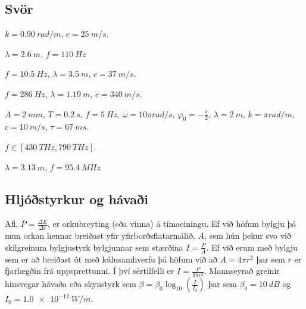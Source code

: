 \ifdefined \wholebook \else\documentclass[oneside]{book}\usepackage{EdlBook}\graphicspath{{figures/}}
\begin{document}
\subsection*{Svör}

\begin{enumerate*}[label = \vspace{0.15cm} \textbf{(\arabic*)}]
    \setcounter{enumi}{7}
  \item $k = \SI{0.90}{rad/m}$, $c = \SI{25}{m/s}$.
  \item $\lambda = \SI{2.6}{m}$, $f = \SI{110}{Hz}$
  \item $f = \SI{10.5}{Hz}$, $\lambda = \SI{3.5}{m}$, $c = \SI{37}{m/s}$.
  \item $f = \SI{286}{Hz}$, $\lambda = \SI{1.19}{m}$, $c = \SI{340}{m/s}$.
  \item $A = \SI{2}{mm}$, $T = \SI{0.2}{s}$, $f = \SI{5}{Hz}$, $\omega = 10 \pi \si{rad/s}$, $\varphi_0 = -\frac{\pi}{2}$, $\lambda = \SI{2}{m}$, $k = \pi \si{rad/m}$, $c = \SI{10}{m/s}$, $\tau = \SI{67}{ms}$.
  \item $f \in [\SI{430}{THz}, \SI{790}{THz}]$.
  \item $\lambda = \SI{3.13}{m}$, $f = \SI{95.4}{MHz}$
\end{enumerate*}

\newpage

\subsection*{Hljóðstyrkur og hávaði}

\begin{tcolorbox}
Afl, $P = \frac{\Delta E}{\Delta t}$, er orkubreyting (eða vinna) á tímaeiningu. Ef við höfum bylgju þá mun orkan hennar breiðast yfir yfirborðsflatarmálið, $A$, sem hún þekur svo við skilgreinum bylgjustyrk bylgjunnar sem stærðina $I = \frac{P}{A}$. Ef við erum með bylgju sem er að breiðast út með kúlusamhverfu þá höfum við að $A = 4\pi r^2$ þar sem $r$ er fjarlægðin frá uppsprettunni. Í því sértilfelli er $I = \frac{P}{4\pi r^2}$. Mannseyrað greinir hinsvegar hávaða eða skynstyrk sem $\beta = \beta_0 \log_{10}\left( \frac{I}{I_0} \right)$ þar sem $\beta_0 = \SI{10}{dB}$ og $I_0 = \SI{1.0e-12}{W/m}$.
\end{tcolorbox}
\end{document}
